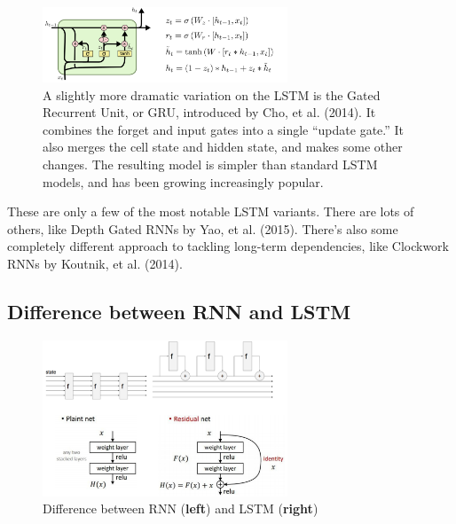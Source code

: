\begin{figure}[h]
  \centering
  \includegraphics[width=0.65\textwidth]{Images/recurrent_neural_networks/27.png}
  \caption{A slightly more dramatic variation on the LSTM is the Gated Recurrent Unit, or GRU, introduced by Cho, et al. (2014). It combines the forget and input gates into a single ``update gate.” It also merges the cell state and hidden state, and makes some other changes. The resulting model is simpler than standard LSTM models, and has been growing increasingly popular.}
\end{figure}

These are only a few of the most notable LSTM variants. There are lots of others, like Depth Gated RNNs by Yao, et al. (2015). There’s also some completely different approach to tackling long-term dependencies, like Clockwork RNNs by Koutnik, et al. (2014).

\subsection*{Difference between RNN and LSTM}
\begin{figure}[!htb]
  \centering
  \includegraphics[width=0.65\textwidth]{Images/recurrent_neural_networks/19.png}
  \caption{Difference between RNN (\textbf{left}) and LSTM (\textbf{right})}
\end{figure}

